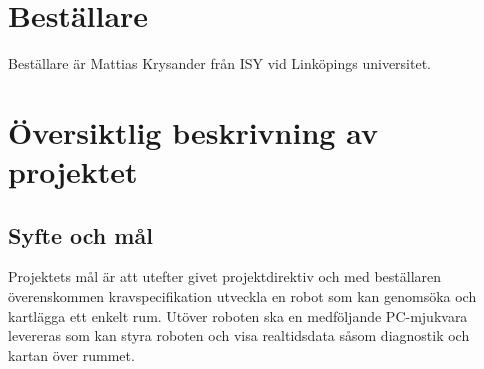 \documentclass[a4paper,11pt]{article}
\begin{document}
\pagestyle{intro}
\LIPStitelsida
\clearpage
\begin{LIPSprojektidentitet}
\end{LIPSprojektidentitet}
\clearpage
\renewcommand{\familydefault}{\sfdefault}	%
\normalfont
\tableofcontents
\renewcommand{\familydefault}{\rmdefault}	%
\normalfont
\clearpage
\begin{LIPSdokumenthistorik}
\end{LIPSdokumenthistorik}
\clearpage
\setcounter{page}{1}
\pagestyle{content}
\section{Beställare}
Beställare är Mattias Krysander från ISY vid Linköpings universitet.

\section{Översiktlig beskrivning av projektet}
\subsection{Syfte och mål}
Projektets mål är att utefter givet projektdirektiv och med beställaren överenskommen kravspecifikation utveckla en robot som kan genomsöka och kartlägga ett enkelt rum. Utöver roboten ska en medföljande PC-mjukvara levereras som kan styra roboten och visa realtidsdata såsom diagnostik och kartan över rummet.
\end{document}
